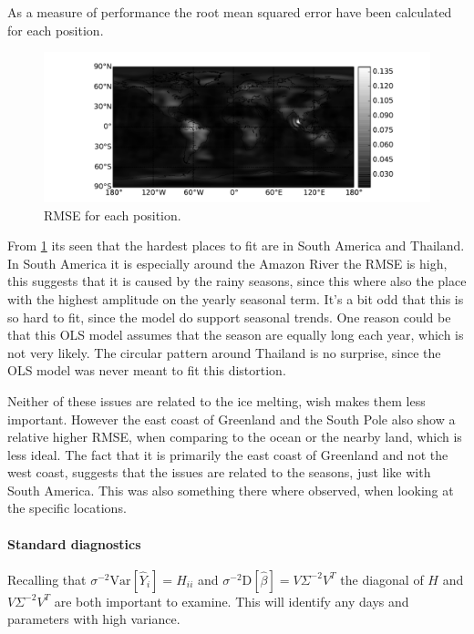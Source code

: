 As a measure of performance the root mean squared error have been calculated for each position.
\begin{figure}[H]
	\centering
	\includegraphics[width=\textwidth]{figures/ols-world-performance-rmse}
	\caption{RMSE for each position.}
	\label{fig:ols-world-performance-rmse}
\end{figure}

From \ref{fig:ols-world-performance-rmse} its seen that the hardest places to fit are in South America and Thailand. In South America it is especially around the Amazon River the RMSE is high, this suggests that it is caused by the rainy seasons, since this where also the place with the highest amplitude on the yearly seasonal term. It's a bit odd that this is so hard to fit, since the model do support seasonal trends. One reason could be that this OLS model assumes that the season are equally long each year, which is not very likely. The circular pattern around Thailand is no surprise, since the OLS model was never meant to fit this distortion.

Neither of these issues are related to the ice melting, wish makes them less important. However the east coast of Greenland and the South Pole also show a relative higher RMSE, when comparing to the ocean or the nearby land, which is less ideal. The fact that it is primarily the east coast of Greenland and not the west coast, suggests that the issues are related to the seasons, just like with South America. This was also something there where observed, when looking at the specific locations.

\paragraph{Standard diagnostics} Recalling that $\sigma^{-2} \mathrm{Var}[\hat{Y}_i] = H_{ii}$ and $\sigma^{-2} \mathrm{D}[\hat{\beta}] = V \Sigma^{-2} V^T$ the diagonal of $H$ and $V \Sigma^{-2} V^T$ are both important to examine. This will identify any days and parameters with high variance.

